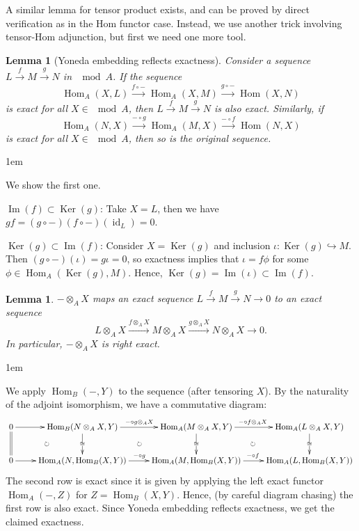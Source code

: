 \documentclass[11pt,a4paper]{article}
\makeatletter
\numberwithin{equation}{section}
\renewenvironment{proof}[1][\proofname]{\par
    \pushQED{\qed}%
    \normalfont \topsep0\p@\@plus6\p@ \labelsep1em\relax
    \trivlist
    \item[\hskip\labelsep\indent
        \bfseries #1]\ignorespaces
    \mbox{}
}{
    \popQED\endtrivlist\@endpefalse
}
\theoremstyle{all}
\newtheorem{lemma}[theorem]{Lemma}
\theoremstyle{remark}
\newtheorem{remark}[theorem]{Remark}
\newcommand{\id}{\operatorname{id}}
\newcommand{\Hom}{\operatorname{Hom}\nolimits}
\renewcommand{\Im}{\operatorname{Im}\nolimits}
\newcommand{\Ker}{\operatorname{Ker}\nolimits}
\makeatother
\begin{document}
A similar lemma for tensor product exists, and can be proved by direct verification as in the Hom functor case.  Instead, we use another trick involving tensor-Hom adjunction, but first we need one more tool.

\begin{lemma}[Yoneda embedding reflects exactness]\label{lem:Yoneda lemma exactness}
Consider a sequence $L\xrightarrow{f}M\xrightarrow{g} N$ in $\mod A$.
If the sequence
\[
\Hom_A(X,L)\xrightarrow{f\circ-} \Hom_A(X,M) \xrightarrow{g\circ -} \Hom(X,N)
\]
is exact for all $X\in\mod A$, then $L\xrightarrow{f}M\xrightarrow{g} N$ is also exact.
Similarly, if 
\[
\Hom_A(N,X)\xrightarrow{-\circ g} \Hom_A(M,X) \xrightarrow{-\circ f} \Hom(N,X)
\]
is exact for all $X\in\mod A$, then so is the original sequence.
\end{lemma}
\begin{proof}
We show the first one.

\underline{$\Im(f)\subset \Ker(g)$}: Take $X=L$, then we have $gf=(g\circ -)(f\circ -)(\id_L)=0$.

\underline{$\Ker(g)\subset\Im(f)$}:  Consider $X=\Ker(g)$ and inclusion $\iota:\Ker(g)\hookrightarrow M$.
Then $(g\circ-)(\iota)=g\iota = 0$, so exactness implies that $\iota=f\phi$ for some $\phi\in\Hom_A(\Ker(g),M)$.  Hence, $\Ker(g)=\Im(\iota) \subset \Im(f)$.
\end{proof}

\begin{lemma}
$-\otimes_A X$ maps an exact sequence $L\xrightarrow{f}M\xrightarrow{g} N\to 0$ to an exact sequence
\[
L\otimes_AX\xrightarrow{f\otimes_AX} M\otimes_AX \xrightarrow{g\otimes_AX} N\otimes_AX \to 0.
\]
In particular, $-\otimes_A X$ is right exact.
\end{lemma}
\begin{proof}
We apply $\Hom_B(-,Y)$ to the sequence (after tensoring $X$).
By the naturality of the adjoint isomorphism, we have a commutative diagram:
\[
\xymatrix{
0\ar[r]\ar@{=}[d]\ar@{}[rd]|{\circlearrowright} & \Hom_B(N\otimes_A X,Y)\ar[r]^{-\circ g\otimes_AX}\ar[d]|{\cong}\ar@{}[rd]|{\circlearrowright} & \Hom_A(M\otimes_AX,Y) \ar[r]^{-\circ f\otimes_AX}\ar[d]|{\cong} \ar@{}[rd]|{\circlearrowright} & \Hom_A(L\otimes_AX,Y) \ar[d]|{\cong}\\
0\ar[r] & \Hom_A(N,\Hom_B(X,Y))\ar[r]^{-\circ g} & \Hom_A(M,\Hom_B(X,Y)) \ar[r]^{-\circ f} & \Hom_A(L,\Hom_B(X,Y))
}
\]
The second row is exact since it is given by applying the left exact functor $\Hom_A(-,Z)$ for $Z=\Hom_B(X,Y)$.
Hence, (by careful diagram chasing) the first row is also exact.  
Since Yoneda embedding reflects exactness, we get the claimed exactness.
\end{proof}
\end{document}
